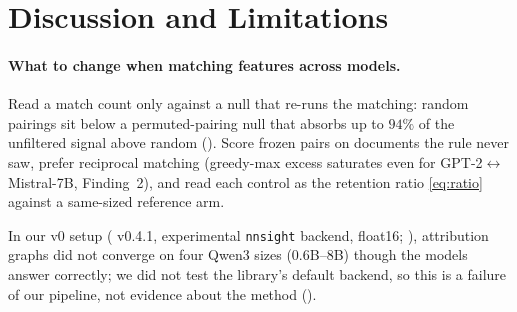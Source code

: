 \section{Discussion and Limitations}\label{sec:discussion}

\paragraph{What to change when matching features across models.} Read a match count only against
a null that re-runs the matching: random pairings sit below a permuted-pairing null that absorbs
up to $94\%$ of the unfiltered \citeauthor{lan2024universal} signal above random
(). Score frozen pairs on documents the rule never saw, prefer reciprocal matching
(greedy-max excess saturates even for GPT-2$\leftrightarrow$Mistral-7B, Finding~2), and read each
control as the retention ratio \eqref{eq:ratio} against a same-sized reference arm.

\label{sec:disc:negative}In our v0 setup (\circuittracer{} v0.4.1, experimental \texttt{nnsight}
backend, float16; ), attribution graphs did not converge on four Qwen3 sizes
(0.6B--8B) though the models answer correctly; we did not test the library's default backend, so
this is a failure of our pipeline, not evidence about the method ().
